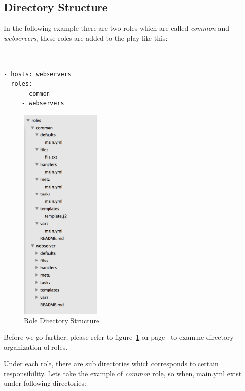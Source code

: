 \documentclass[10pt]{book}
\begin{document}
\subsection{Directory Structure}
 In the following example there are two roles which are called \emph{common} and \emph{webservers}, 
 these roles are added to the play like this:

\begin{Verbatim} 
 
---
- hosts: webservers
  roles:
     - common
     - webservers

\end{Verbatim}


\begin{figure}
  \begin{center}
    \includegraphics[width=0.35\textwidth]{figures/roles-directory.png}
   \end{center}
   \caption{Role Directory Structure}
	\label{fig:roles}
\end{figure}

Before we go further, please refer to figure~\ref{fig:roles} on page~\pageref{fig:roles} to examine 
directory organization of roles.


 

Under each role, there are sub directories which corresponds to certain responsibility. Lets take the 
example of \emph{common} role, so when, main.yml exist under following directories:
 
\end{document}
